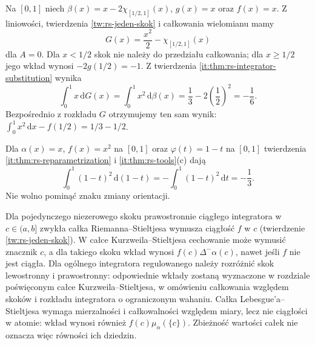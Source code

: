 \begin{przyklad}\label{it:ex:rs-substitution-atom}
Na $[0,1]$ niech $\beta(x)=x-2\chi_{[1/2,1]}(x)$,
$g(x)=x$ oraz $f(x)=x$. Z liniowości, twierdzenia
\ref{tw:rs-jeden-skok} i całkowania wielomianu mamy
\[
 G(x)=\frac{x^2}{2}-\chi_{[1/2,1]}(x)
\]
dla $A=0$. Dla $x<1/2$ skok nie należy do przedziału całkowania;
dla $x\ge1/2$ jego wkład wynosi $-2g(1/2)=-1$.
Z twierdzenia \ref{it:thm:rs-integrator-substitution} wynika
\[
 \int_0^1 x\,\mathrm dG(x)
 =\int_0^1 x^2\,\mathrm d\beta(x)
 =\frac13-2\left(\frac12\right)^2=-\frac16.
\]
Bezpośrednio z rozkładu $G$ otrzymujemy ten sam wynik:
$\int_0^1 x^2\,\mathrm dx-f(1/2)=1/3-1/2$.
\end{przyklad}

\begin{przyklad}\label{it:ex:rs-substitution-reverse}
Dla $\alpha(x)=x$, $f(x)=x^2$ na $[0,1]$ oraz
$\varphi(t)=1-t$ na $[0,1]$ twierdzenia
\ref{it:thm:rs-reparametrization} i \ref{it:thm:rs-tools}(c) dają
\[
 \int_0^1(1-t)^2\,\mathrm d(1-t)
 =-\int_0^1(1-t)^2\,\mathrm dt=-\frac13.
\]
Nie wolno pominąć znaku zmiany orientacji.
\end{przyklad}

\begin{uwaga}
Dla pojedynczego niezerowego skoku prawostronnie ciągłego integratora w $c\in(a,b]$ zwykła całka Riemanna--Stieltjesa wymusza ciągłość $f$ w $c$ (twierdzenie \ref{tw:rs-jeden-skok}). W całce Kurzweila--Stieltjesa cechowanie może wymusić znacznik $c$, a dla takiego skoku wkład wynosi $f(c)\Delta^-\alpha(c)$, nawet jeśli $f$ nie jest ciągła. Dla ogólnego integratora regulowanego należy rozróżnić skok lewostronny i prawostronny: odpowiednie wkłady zostaną wyznaczone w rozdziale poświęconym całce Kurzweila--Stieltjesa, w omówieniu całkowania względem skoków i rozkładu integratora o ograniczonym wahaniu. Całka Lebesgue'a--Stieltjesa wymaga mierzalności i całkowalności względem miary, lecz nie ciągłości w atomie: wkład wynosi również $f(c)\mu_\alpha(\{c\})$. Zbieżność wartości całek nie oznacza więc równości ich dziedzin.
\end{uwaga}
\endgroup
